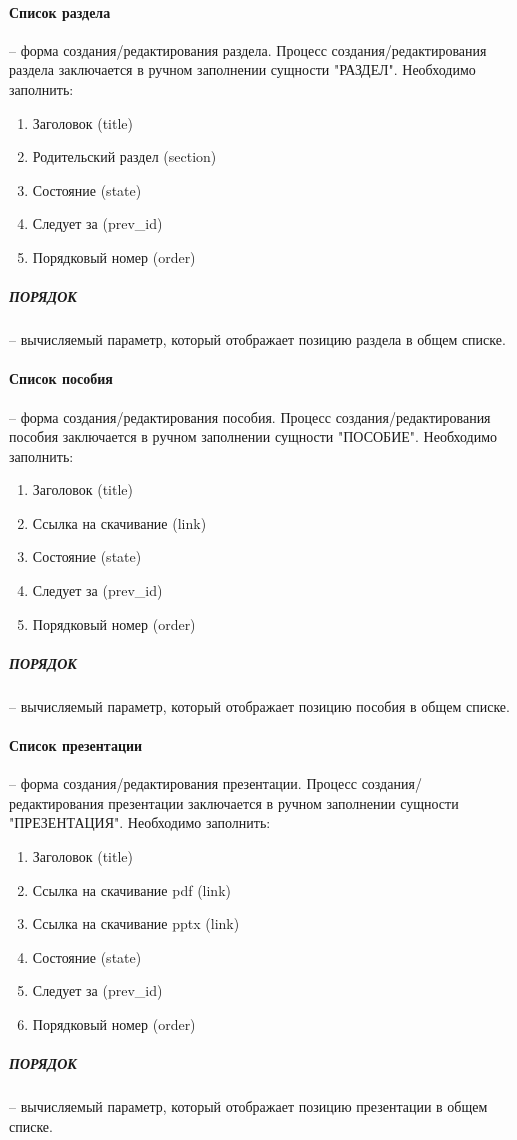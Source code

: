 \paragraph{Список раздела} -- форма создания/редактирования раздела.
Процесс создания/редактирования раздела заключается в ручном заполнении сущности "РАЗДЕЛ".
Необходимо заполнить:
\begin{enumerate}
  \item Заголовок (title)
  \item Родительский раздел (section)
  \item Состояние (state)
  \item Следует за (prev\_id)
  \item Порядковый номер (order)
\end{enumerate}
\subparagraph{ПОРЯДОК} -- вычисляемый параметр, который отображает позицию раздела в общем списке.

\paragraph{Список пособия} -- форма создания/редактирования пособия.
Процесс создания/редактирования пособия заключается в ручном заполнении сущности "ПОСОБИЕ".
Необходимо заполнить:
\begin{enumerate}
  \item Заголовок (title)
  \item Ссылка на скачивание (link)
  \item Состояние (state)
  \item Следует за (prev\_id)
  \item Порядковый номер (order)
\end{enumerate}
\subparagraph{ПОРЯДОК} -- вычисляемый параметр, который отображает позицию пособия в общем списке.

\paragraph{Список презентации} -- форма создания/редактирования презентации.
Процесс создания/редактирования презентации заключается в ручном заполнении сущности "ПРЕЗЕНТАЦИЯ".
Необходимо заполнить:
\begin{enumerate}
  \item Заголовок (title)
  \item Ссылка на скачивание pdf (link)
  \item Ссылка на скачивание pptx (link)
  \item Состояние (state)
  \item Следует за (prev\_id)
  \item Порядковый номер (order)
\end{enumerate}
\subparagraph{ПОРЯДОК} -- вычисляемый параметр, который отображает позицию презентации в общем списке.

